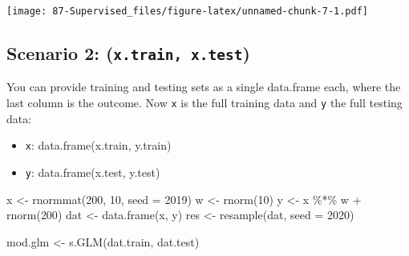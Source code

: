 \documentclass[
]{book}
\newenvironment{Shaded}{\begin{snugshade}}{\end{snugshade}}
\newcommand{\AttributeTok}[1]{\textcolor[rgb]{0.77,0.63,0.00}{#1}}
\newcommand{\DecValTok}[1]{\textcolor[rgb]{0.00,0.00,0.81}{#1}}
\newcommand{\FunctionTok}[1]{\textcolor[rgb]{0.00,0.00,0.00}{#1}}
\newcommand{\NormalTok}[1]{#1}
\newcommand{\OtherTok}[1]{\textcolor[rgb]{0.56,0.35,0.01}{#1}}
\newcommand{\SpecialCharTok}[1]{\textcolor[rgb]{0.00,0.00,0.00}{#1}}
\providecommand{\tightlist}{%
  \setlength{\itemsep}{0pt}\setlength{\parskip}{0pt}}
\begin{document}
\texttt{[image: 87-Supervised\_files/figure-latex/unnamed-chunk-7-1.pdf]}

\hypertarget{scenario-2-x.train-x.test}{%
\subsection{\texorpdfstring{Scenario 2: (\texttt{x.train,\ x.test})}{Scenario 2: (x.train, x.test)}}\label{scenario-2-x.train-x.test}}

You can provide training and testing sets as a single data.frame each, where the last column is the outcome. Now \texttt{x} is the full training data and \texttt{y} the full testing data:

\begin{itemize}
\tightlist
\item
  \texttt{x}: data.frame(x.train, y.train)
\item
  \texttt{y}: data.frame(x.test, y.test)
\end{itemize}

\begin{Shaded}
\begin{Highlighting}[]
\NormalTok{x }\OtherTok{\textless{}{-}} \FunctionTok{rnormmat}\NormalTok{(}\DecValTok{200}\NormalTok{, }\DecValTok{10}\NormalTok{, }\AttributeTok{seed =} \DecValTok{2019}\NormalTok{)}
\NormalTok{w }\OtherTok{\textless{}{-}} \FunctionTok{rnorm}\NormalTok{(}\DecValTok{10}\NormalTok{)}
\NormalTok{y }\OtherTok{\textless{}{-}}\NormalTok{ x }\SpecialCharTok{\%*\%}\NormalTok{ w }\SpecialCharTok{+} \FunctionTok{rnorm}\NormalTok{(}\DecValTok{200}\NormalTok{)}
\NormalTok{dat }\OtherTok{\textless{}{-}} \FunctionTok{data.frame}\NormalTok{(x, y)}
\NormalTok{res }\OtherTok{\textless{}{-}} \FunctionTok{resample}\NormalTok{(dat, }\AttributeTok{seed =} \DecValTok{2020}\NormalTok{)}
\end{Highlighting}
\end{Shaded}

\begin{Shaded}
\end{Shaded}

\begin{Shaded}
\begin{Highlighting}[]
\NormalTok{mod.glm }\OtherTok{\textless{}{-}} \FunctionTok{s.GLM}\NormalTok{(dat.train, dat.test)}
\end{Highlighting}
\end{Shaded}
\end{document}
